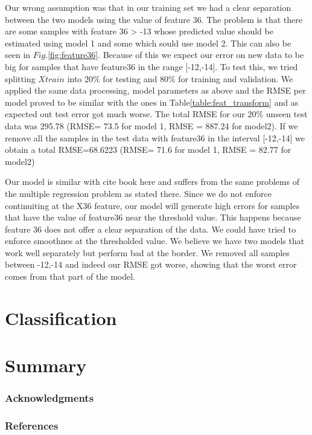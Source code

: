 \documentclass{article} %
\begin{document}
Our wrong assumption was that in our training set we had a clear separation between the two models using the value of feature 36. The problem is that there are some samples with feature 36 > -13 whose predicted value should be estimated using model 1 and some which sould use model 2. This can also be seen in $Fig.$\ref{fig:feature36}.
 Because of this we expect our error on new data to be big for samples that have feature36 in the range [-12,-14].
To test this, we tried splitting $Xtrain$ into $20\%$ for testing and $80\%$ for training and validation. We applied the same data processing, model parameters as above and the RMSE per model proved to be similar with the ones in Table\ref{table:feat_transform} and as expected out test error got much worse. The total RMSE for our $20\%$ unseen test data
was   295.78 (RMSE= 73.5 for model 1, RMSE = 887.24 for model2).
If we remove all the samples in the test data with feature36 in the interval [-12,-14] we obtain a total RMSE=68.6223 (RMSE= 71.6 for model 1, RMSE = 82.77 for model2)
   

Our model is similar with cite book here and suffers from the same problems of the multiple regression problem as stated there.
Since we do not enforce continuiting at the X36 feature, our model will generate high errors for samples that have the value of feature36 near the threshold value. This happens because feature 36 does not offer a clear separation of the data. We could have tried to enforce smoothnes at the thresholded value. We believe we have two models that work well separately but perform bad at the border. We removed all samples between -12,-14 and indeed our RMSE got worse, showing that the worst error comes from that part of the model.


\section{Classification}





\section{Summary}


\subsubsection*{Acknowledgments}

\subsubsection*{References}
\end{document}
